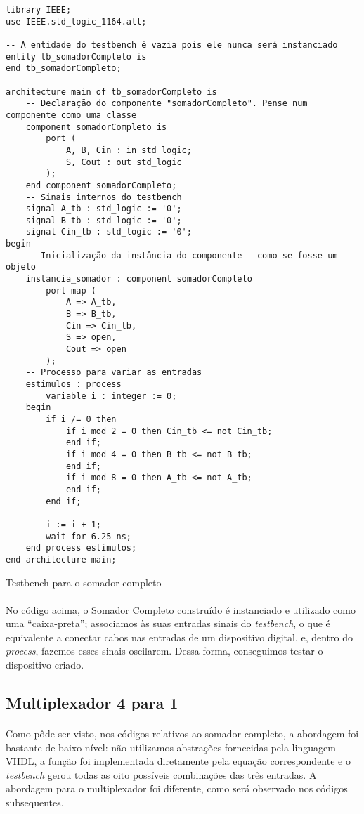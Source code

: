 \documentclass[a4paper,12pt]{article}
\newenvironment{code}{\captionsetup{type=listing}}{}
\begin{document}
\begin{code}
\begin{verbatim}
library IEEE;
use IEEE.std_logic_1164.all;

-- A entidade do testbench é vazia pois ele nunca será instanciado
entity tb_somadorCompleto is
end tb_somadorCompleto;

architecture main of tb_somadorCompleto is
    -- Declaração do componente "somadorCompleto". Pense num componente como uma classe
    component somadorCompleto is
        port (
            A, B, Cin : in std_logic;
            S, Cout : out std_logic
        );
    end component somadorCompleto;
    -- Sinais internos do testbench
    signal A_tb : std_logic := '0';
    signal B_tb : std_logic := '0';
    signal Cin_tb : std_logic := '0';
begin
    -- Inicialização da instância do componente - como se fosse um objeto
    instancia_somador : component somadorCompleto 
        port map (
            A => A_tb,
            B => B_tb,
            Cin => Cin_tb,
            S => open,
            Cout => open
        );
    -- Processo para variar as entradas
    estimulos : process
        variable i : integer := 0;
    begin
        if i /= 0 then
            if i mod 2 = 0 then Cin_tb <= not Cin_tb;
            end if;
            if i mod 4 = 0 then B_tb <= not B_tb;
            end if;
            if i mod 8 = 0 then A_tb <= not A_tb;
            end if;
        end if;

        i := i + 1;
        wait for 6.25 ns;
    end process estimulos;
end architecture main;
\end{verbatim}
\caption{Testbench para o somador completo}
\end{code}

\paragraph{}
No código acima, o Somador Completo construído é instanciado e utilizado como uma ``caixa-preta''; associamos às suas entradas sinais do \textit{testbench}, o que é equivalente a conectar cabos nas entradas de um dispositivo digital, e, dentro do \textit{process}, fazemos esses sinais oscilarem. Dessa forma, conseguimos testar o dispositivo criado.

\subsection{Multiplexador 4 para 1}
\paragraph{}
Como pôde ser visto, nos códigos relativos ao somador completo, a abordagem foi bastante de baixo nível: não utilizamos abstrações fornecidas pela linguagem VHDL, a função foi implementada diretamente pela equação correspondente e o \textit{testbench} gerou todas as oito possíveis combinações das três entradas. A abordagem para o multiplexador foi diferente, como será observado nos códigos subsequentes.
\end{document}
